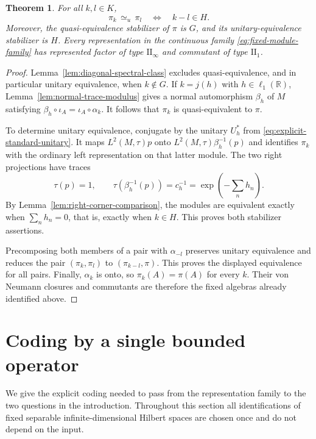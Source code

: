 \documentclass[11pt]{article}
\newtheorem{theorem}{Theorem}[section]
\theoremstyle{definition}
\newcommand{\R}{\mathbb R}
\newcommand{\UE}{\mathrel{\simeq_u}}
\begin{document}
\begin{theorem}
\label{thm:representation}
For all $k,l\in K$,
\[
 \pi_k\,\UE\,\pi_l\quad\Longleftrightarrow\quad k-l\in H.
\]
Moreover, the quasi-equivalence stabilizer of $\pi$ is $G$, and its
unitary-equivalence stabilizer is $H$. Every representation in the
continuous family \eqref{eq:fixed-module-family} has represented factor
of type $\mathrm{II}_\infty$ and commutant of type $\mathrm{II}_1$.
\end{theorem}

\begin{proof}
Lemma~\ref{lem:diagonal-spectral-class} excludes quasi-equivalence,
and in particular unitary equivalence, when $k\notin G$. If $k=j(h)$
with $h\in\ell_1(\R)$, Lemma~\ref{lem:normal-trace-modulus} gives a
normal automorphism $\beta_h$ of $M$ satisfying
$\beta_h\circ\iota_A=\iota_A\circ\alpha_k$. It follows that
$\pi_k$ is quasi-equivalent to $\pi$.

To determine unitary equivalence, conjugate by the unitary $U_h^*$
from \eqref{eq:explicit-standard-unitary}. It maps
$L^2(M,\tau)p$ onto $L^2(M,\tau)\beta_h^{-1}(p)$ and identifies
$\pi_k$ with the ordinary left representation on that latter module.
The two right projections have traces
\[
 \tau(p)=1,\qquad
 \tau(\beta_h^{-1}(p))=c_h^{-1}
       =\exp\!\left(-\sum_n h_n\right).
\]
By Lemma~\ref{lem:right-corner-comparison}, the modules are equivalent
exactly when $\sum_n h_n=0$, that is, exactly when $k\in H$.
This proves both stabilizer assertions.

Precomposing both members of a pair with $\alpha_{-l}$ preserves
unitary equivalence and reduces the pair $(\pi_k,\pi_l)$ to
$(\pi_{k-l},\pi)$. This proves the displayed equivalence for all pairs.
Finally, $\alpha_k$ is onto, so $\pi_k(A)=\pi(A)$ for every $k$.
Their von Neumann closures and commutants are therefore the fixed
algebras already identified above.
\end{proof}
\section{Coding by a single bounded operator}\label{sec:coding}
We give the explicit coding needed to pass from the representation family
to the two questions in the introduction. Throughout this section all
identifications of fixed separable infinite-dimensional Hilbert spaces
are chosen once and do not depend on the input.
\end{document}
